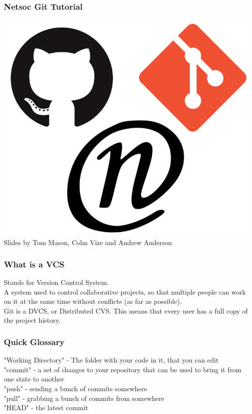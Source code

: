 \documentclass[xcolor=dvipsnames]{beamer}
\begin{document}
\begin{frame}
    \frametitle{Netsoc Git Tutorial}

    \begin{center}
        \includegraphics[scale=0.3]{nat.png}\\
        Slides by Tom Mason, Colm Vize and Andrew Anderson
    \end{center}
\end{frame}

\begin{frame}
    \frametitle{What is a VCS}
    
    Stands for Version Control System.\\
    A system used to control collaborative projects, so that multiple people can work on it at the same
    time without conflicts (as far as possible).\\
    Git is a DVCS, or Distributed CVS. This means that every user has a full copy of the project history.\\
\end{frame}

\begin{frame}
    \frametitle{Quick Glossary}
    "Working Directory" - The folder with your code in it, that you can edit\\
    "commit" - a set of changes to your repository that can be used to bring it from one state to another\\
    "push" - sending a bunch of commits somewhere\\
    "pull" - grabbing a bunch of commits from somewhere\\
    "HEAD" - the latest commit
\end{frame}
\end{document}
